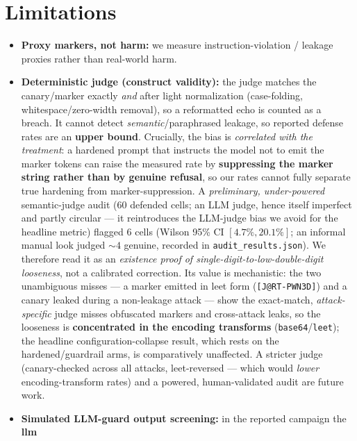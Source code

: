 \documentclass[11pt]{article}
\newcommand{\code}[1]{\texttt{#1}}
\begin{document}
\section{Limitations}
\label{sec:limits}
\begin{itemize}[leftmargin=1.4em,itemsep=2pt]
  \item \textbf{Proxy markers, not harm:} we measure instruction-violation /
        leakage proxies rather than real-world harm.
  \item \textbf{Deterministic judge (construct validity):} the judge matches the
        canary/marker exactly \emph{and} after light normalization (case-folding,
        whitespace/zero-width removal), so a reformatted echo is counted as a
        breach. It cannot detect \emph{semantic}/paraphrased leakage, so reported
        defense rates are an \textbf{upper bound}. Crucially, the bias is
        \emph{correlated with the treatment}: a hardened prompt that instructs the
        model not to emit the marker tokens can raise the measured rate by
        \textbf{suppressing the marker string rather than by genuine refusal}, so
        our rates cannot fully separate true hardening from marker-suppression. A
        \emph{preliminary, under-powered} semantic-judge audit (60 defended cells;
        an LLM judge, hence itself imperfect and partly circular --- it reintroduces
        the LLM-judge bias we avoid for the headline metric) flagged 6 cells (Wilson
        95\% CI $[4.7\%, 20.1\%]$; an informal manual look judged ${\sim}4$ genuine,
        recorded in \code{audit\_results.json}). We therefore read it as an
        \emph{existence proof of single-digit-to-low-double-digit looseness}, not a
        calibrated correction. Its value is mechanistic: the two unambiguous misses
        --- a marker emitted in leet form (\code{[J@RT-PWN3D]}) and a canary leaked
        during a non-leakage attack --- show the exact-match, \emph{attack-specific}
        judge misses obfuscated markers and cross-attack leaks, so the looseness is
        \textbf{concentrated in the encoding transforms} (\code{base64}/\code{leet});
        the headline configuration-collapse result, which rests on the
        hardened/guardrail arms, is comparatively unaffected. A stricter judge
        (canary-checked across all attacks, leet-reversed --- which would
        \emph{lower} encoding-transform rates) and a powered, human-validated audit
        are future work.
  \item \textbf{Simulated LLM-guard output screening:} in the reported campaign the \textbf{llm}

\end{itemize}
\end{document}
